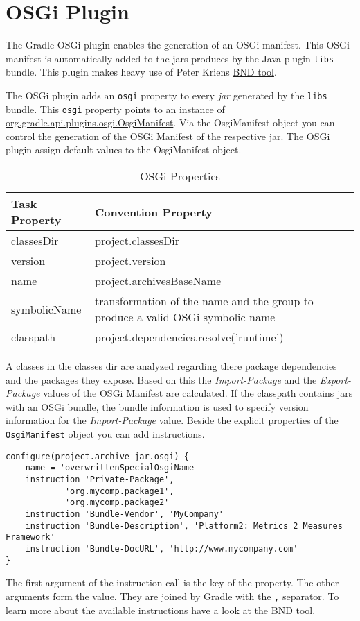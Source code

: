 \chapter{OSGi Plugin} %
\label{cha:osgi_plugin}
The Gradle OSGi plugin enables the generation of an OSGi manifest. This OSGi manifest is automatically added to the jars produces by the Java plugin \texttt{libs} bundle. This plugin makes heavy use of Peter Kriens \href{http://www.aqute.biz/Code/Bnd}{BND tool}. 

The OSGi plugin adds an \texttt{osgi} property to every \emph{jar} generated by the \texttt{libs} bundle. This \texttt{osgi} property points to an instance of \href{\API plugins.osgi/OsgiManifest.html}{org.gradle.api.plugins.osgi.OsgiManifest}. Via the OsgiManifest object you can control the generation of the OSGi Manifest of the respective jar. The OSGi plugin assign default values to the OsgiManifest object. 
\begin{table}
\begin{center}
	\begin{tabular}{|l|l|l|} \hline
		Task Property & Convention Property \\ \hline
		classesDir & project.classesDir \\ \hline
		version & project.version \\ \hline
		name & project.archivesBaseName \\ \hline
		symbolicName & transformation of the name and the group to produce a valid OSGi symbolic name \\ \hline		
		classpath & project.dependencies.resolve('runtime') \\ \hline		
	\end{tabular}
\end{center}
\caption{OSGi Properties}
\end{table}
A classes in the classes dir are analyzed regarding there package dependencies and the packages they expose. Based on this the \emph{Import-Package} and the \emph{Export-Package} values of the OSGi Manifest are calculated. If the classpath contains jars with an OSGi bundle, the bundle information is used to specify version information for the \emph{Import-Package} value. Beside the explicit properties of the \texttt{OsgiManifest} object you can add instructions.
\begin{Verbatim}
configure(project.archive_jar.osgi) {
    name = 'overwrittenSpecialOsgiName
    instruction 'Private-Package',
            'org.mycomp.package1',
            'org.mycomp.package2'
    instruction 'Bundle-Vendor', 'MyCompany'
    instruction 'Bundle-Description', 'Platform2: Metrics 2 Measures Framework'
    instruction 'Bundle-DocURL', 'http://www.mycompany.com'
}
\end{Verbatim}
The first argument of the instruction call is the key of the property. The other arguments form the value. They are joined by Gradle with the \texttt{,} separator. To learn more about the available instructions have a look at the \href{http://www.aqute.biz/Code/Bnd}{BND tool}.
